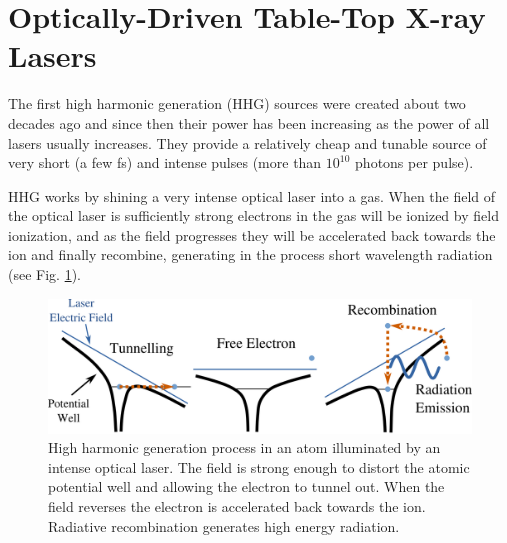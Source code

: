 \section{Optically-Driven Table-Top X-ray Lasers}

The first high harmonic generation (HHG) sources were created about two decades ago
and since then their power has been increasing as the power of all lasers usually
increases. They provide a relatively cheap and tunable source of very
short (a few fs) and intense pulses (more than $10^{10}$ photons per pulse). 

HHG works by shining a very intense optical laser into a gas. When the field of
the optical laser is sufficiently strong electrons in the gas will be ionized
by field ionization, and as the field progresses they will be accelerated back
towards the ion and finally recombine, generating in the process short
wavelength radiation (see Fig. \ref{Fig:HHG_Process}).

\begin{figure}[h]
\centering
  \includegraphics[width=1.0 \columnwidth]{HHG_Picture1.png}
  \caption{High harmonic generation process in an atom illuminated by an intense
    optical laser. The field is strong enough to distort the atomic potential
    well and allowing the electron to tunnel out. When the field reverses the
    electron is accelerated back towards the ion. Radiative recombination generates high
    energy radiation. \cite{Corkum1993Plasma,Lewenstein1994Theory}}
  \label{Fig:HHG_Process}
\end{figure}


